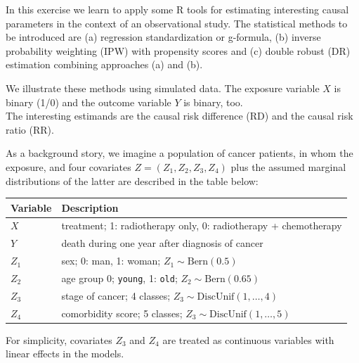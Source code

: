 \documentclass[
]{book}
\newcounter{none} %
\theoremstyle{definition}
\theoremstyle{definition}
\theoremstyle{definition}
\theoremstyle{definition}
\theoremstyle{remark}
\begin{document}
In this exercise we learn to apply some R tools for estimating
interesting causal parameters in the context of an observational study.
The statistical methods to be introduced are (a) regression
standardization or g-formula, (b) inverse probability weighting (IPW)
with propensity scores and (c) double robust (DR) estimation combining
approaches (a) and (b).

We illustrate these methods using simulated data. The exposure variable
\(X\) is binary (1/0) and the outcome variable \(Y\) is binary, too.\\
The interesting estimands are the causal risk difference (RD) and the
causal risk ratio (RR).

As a background story, we imagine a population of cancer patients, in
whom the exposure, and four covariates \(Z = (Z_1, Z_2, Z_3, Z_4)\) plus
the assumed marginal distributions of the latter are described in the
table below:

{\def\LTcaptype{none} %
\begin{longtable}[]{@{}
  >{\raggedright\arraybackslash}p{}
  >{\raggedright\arraybackslash}p{}@{}}
\toprule\noalign{}
\begin{minipage}[b]{\linewidth}\raggedright
Variable
\end{minipage} & \begin{minipage}[b]{\linewidth}\raggedright
Description
\end{minipage} \\
\midrule\noalign{}
\endhead
\bottomrule\noalign{}
\endlastfoot
\(X\) & treatment; 1: radiotherapy only, 0: radiotherapy + chemotherapy \\
\(Y\) & death during one year after diagnosis of cancer \\
\(Z_1\) & sex; 0: man, 1: woman; \(Z_1 \sim \text{Bern}(0.5)\) \\
\(Z_2\) & age group 0; \texttt{young}, 1: \texttt{old}; \(Z_2 \sim \text{Bern}(0.65)\) \\
\(Z_3\) & stage of cancer; 4 classes; \(Z_3 \sim \text{DiscUnif}(1, \dots, 4)\) \\
\(Z_4\) & comorbidity score; 5 classes; \(Z_3 \sim \text{DiscUnif}(1, \dots, 5)\) \\
\end{longtable}
}

For simplicity, covariates \(Z_3\) and \(Z_4\) are treated as continuous
variables with linear effects in the models.
\end{document}
